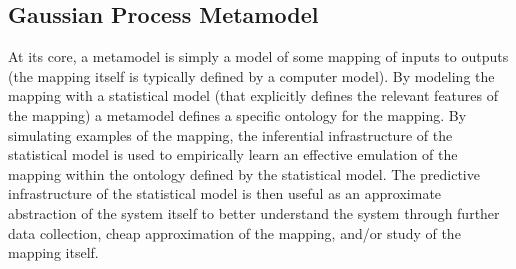%
\subsection{Gaussian Process Metamodel\label{gpmm}}
%

%
At its core, a metamodel is simply a model of some mapping of inputs to outputs
(the mapping itself is typically defined by a computer model). By modeling the
mapping with a statistical model (that explicitly defines the relevant features of the
mapping) a metamodel defines a specific ontology for the mapping.
By simulating examples of the mapping, the inferential infrastructure of the
statistical model is used to empirically learn an effective emulation of the
mapping within the ontology defined by the statistical model. %
The predictive infrastructure of the statistical model is then useful as an
approximate abstraction of the system itself to better understand the system
through further data collection, cheap approximation of the mapping, and/or study
of the mapping itself.

